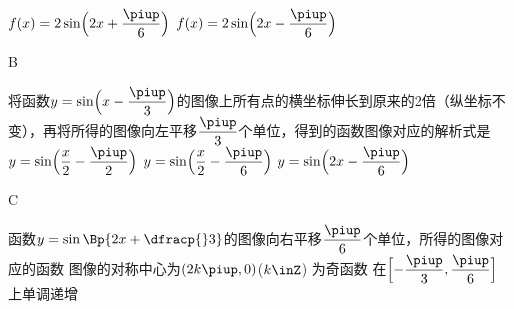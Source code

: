 \begin{exercise}
\begin{minipage}[t]{0.7\linewidth}
             {$f(x)=2\sin\Bigl(2x+\dfrac{\piup}6\Bigr)$}
             {$f(x)=2\sin\Bigl(2x-\dfrac{\piup}6\Bigr)$}
          \end{minipage}\hfill
          \begin{minipage}[h]{0.3\linewidth}
             \vspace{0.5cm}
             \begin{center}
             \end{center}
          \end{minipage}
          \begin{answer}
            B
          \end{answer}
      \vspace{1.5em}
      \item%
        将函数$y=\sin\Bigl(x-\dfrac{\piup}3\Bigr)$的图像上所有点的横坐标伸长到原来的2倍（纵坐标不变），再将所得的图像向左平移$\dfrac{\piup}3$个单位，得到的函数图像对应的解析式是\xz
          {$y=\sin\Bigl(\dfrac x2-\dfrac{\piup}2\Bigr)$}
          {$y=\sin\Bigl(\dfrac{x}2-\dfrac{\piup}6\Bigr)$}
          {$y=\sin\Bigl(2x-\dfrac{\piup}6\Bigr)$}
        \begin{answer}
          C
        \end{answer}
      \vspace{1.5em}
      \item%
        函数$y=\sin\Bp{2x+\dfracp{}3}$的图像向右平移$\dfrac{\piup}6$个单位，所得的图像对应的函数\xz
         {图像的对称中心为$(2k\piup,0)$($k\inZ$)}
         {为奇函数}
         {在$\Bigl[-\dfrac{\piup}3,\dfrac{\piup}6\Bigr]$上单调递增}

\end{exercise}
